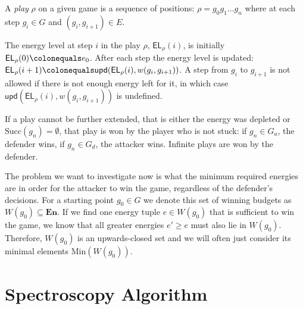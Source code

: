 \begin{definition}
    A \emph{play} $\rho$ on a given game is a sequence of positions:
    $\rho = g_0g_1 \ldots g_n$ where at each step
    $g_i \in G$ and $(g_i, g_{i+1}) \in E$.

    The energy level at step $i$ in the play $\rho$, $\mathsf{EL}_\rho(i)$,
    is initially $\mathsf{EL}_\rho(0) \colonequals e_0$.
    After each step the energy level is updated:
    $\mathsf{EL}_\rho(i + 1) \colonequals
        \mathsf{upd}(\mathsf{EL}_\rho(i), w(g_i, g_{i+1}))$.
    A step from $g_i$ to $g_{i+1}$ is not allowed
    if there is not enough energy left for it,
    in which case $\mathsf{upd}(\mathsf{EL}_\rho(i), w(g_i, g_{i+1}))$ is undefined.

    If a play cannot be further extended,
    that is either the energy was depleted or
    $\mathrm{Succ}(g_n) = \emptyset$,
    that play is won by the player who is not stuck:
    if $g_n \in G_a$, the defender wins, if $g_n \in G_d$, the attacker wins.
    Infinite plays are won by the defender.
\end{definition}

The problem we want to investigate now is
what the minimum required energies are
in order for the attacker to win the game,
regardless of the defender's decisions.
For a starting point $g_0 \in G$ we denote this set of winning budgets as
$W(g_0) \subseteq \mathbf{En}$.
If we find one energy tuple $e \in W(g_0)$ that is sufficient to win the game,
we know that all greater energies $e' \geq e$ must also lie in $W(g_0)$.
Therefore, $W(g_0)$ is an upwards-closed set and we will often just consider
its minimal elements $\mathrm{Min}(W(g_0))$.


\section{Spectroscopy Algorithm}

